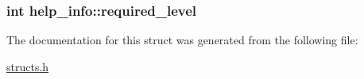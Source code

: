\hypertarget{structhelp__info_aec847b875c832132afb0e132e0126a6b}{
\subsubsection[{required\-\_\-level}]{\setlength{\rightskip}{0pt plus 5cm}int help\-\_\-info\-::required\-\_\-level}}\label{structhelp__info_aec847b875c832132afb0e132e0126a6b}


The documentation for this struct was generated from the following file\-:\begin{DoxyCompactItemize}
\item 
\hyperlink{structs_8h}{structs.\-h}\end{DoxyCompactItemize}
